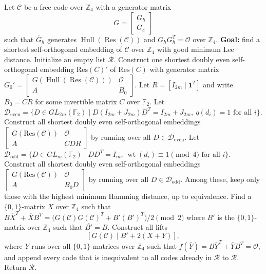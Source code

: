 \documentclass{article}
\theoremstyle{definition}
\theoremstyle{remark}
\begin{document}
\begin{algorithm}[!htb]
\caption{Search for shortest self-orthogonal embeddings over
$\mathbb Z_4$}
\label{embalg}
\begin{algorithmic}[1]
\STATE Let $\mathcal{C}$ be a free code over $\mathbb{Z}_4$ with a
generator matrix
\[
G=
\begin{bmatrix}
G_h\\
G_c
\end{bmatrix}
\]
such that $\overline{G}_h$ generates
$\operatorname{Hull}(\operatorname{Res}(\mathcal{C}))$ and
$G_hG_h^T=\mathcal{O}$ over $\mathbb{Z}_4$.
\STATE \textbf{Goal:} find a shortest self-orthogonal embedding of $\mathcal{C}$ over $\mathbb{Z}_4$ with good minimum Lee distance.
\STATE Initialize an empty list $\mathcal R$.
\STATE Construct one shortest doubly even self-orthogonal embedding $\mathrm{Res}(\mathcal{}C)'$ of $\mathrm{Res}(\mathcal{}C)$ with generator matrix $G_0'=
    \begin{bmatrix}
    G(\operatorname{Hull}(\operatorname{Res}(\mathcal C)))&\mathcal{O}\\
    A&B_0
    \end{bmatrix}$.
    \STATE Let $R=[I_{2m}\mid \mathbf 1^T]$ and write $B_0=CR$
    for some invertible matrix $C$ over $\mathbb F_2$.
    \STATE Let $\mathcal D_{\mathrm{even}}=\{D\in GL_{2m}(\mathbb F_2)\mid D(I_{2m}+J_{2m})D^T=I_{2m}+J_{2m},\ q(d_i)=1\text{ for all }i\}$.
    \STATE Construct all shortest doubly even
    self-orthogonal embeddings $\begin{bmatrix}
        G(\mathrm{Res}(\mathcal{C}))&\mathcal{O}\\
        A & CDR
        \end{bmatrix}$ by running over all $D\in\mathcal D_{\mathrm{even}}$.
\ELSE
    \STATE Let $\mathcal D_{\mathrm{odd}} = \{D\in GL_m(\mathbb F_2)\mid DD^T=I_m,\ \operatorname{wt}(d_i)\equiv 1\pmod 4\text{ for all }i\}$.
    \STATE Construct all shortest doubly even
    self-orthogonal embeddings $\begin{bmatrix}
        G(\mathrm{Res}(\mathcal{C}))&\mathcal{O}\\
        A & B_0D
        \end{bmatrix}$ by running over all $D\in\mathcal D_{\mathrm{odd}}$.
\ENDIF
\STATE Among these, keep only those with the highest minimum Hamming distance, up to equivalence.
    \STATE Find a $\{0, 1\}$-matrix $X$ over $\mathbb{Z}_4$ such that $B\overline{X}^{T}+\overline{X}B^{T} =\bigl(G(\mathcal C)G(\mathcal C)^T+B'(B')^T\bigr)/2\pmod 2$ where $B'$ is the $\{0,1\}$-matrix over $\mathbb Z_4$ such that $\overline{B'}=B$.
    \STATE Construct all lifts 
    \[
        [G(\mathcal{C})\mid B'+2(X+Y)],
    \]
    where $Y$ runs over all $\{0,1\}$-matrices over $\mathbb Z_4$ such that $f(\overline{Y})=B\overline{Y}^{T}+\overline{Y}B^{T}=\mathcal O$, and append every code that is inequivalent to all codes already in $\mathcal{R}$ to $\mathcal{R}$.
\ENDFOR
\STATE Return $\mathcal R$.
\end{algorithmic}
\end{algorithm}
\end{document}
